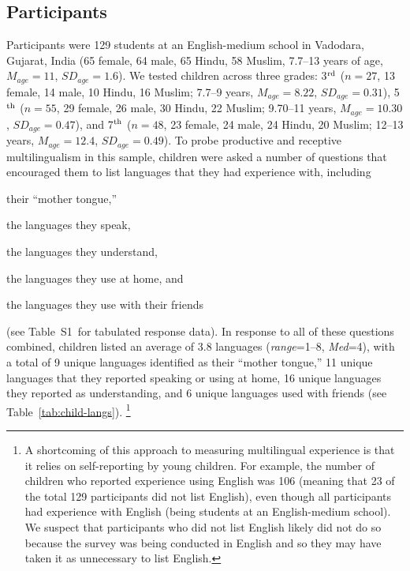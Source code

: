 \documentclass{foushee-adapted-preprint}
\newcommand{\fulllanguagestab}{S1}
\begin{document}
\subsection{Participants}
Participants were 129 students at an English-medium school in Vadodara, Gujarat, India (65 female, 64 male, 65 Hindu, 58 Muslim, 7.7--13 years of age, $M_{age}=11$, $SD_{age}=1.6$). 
We tested children across three grades: 3$^{\textnormal{rd}}$ ($n=27$, 13 female, 14 male, 10 Hindu, 16 Muslim; 7.7--9 years, $M_{age}=8.22$, $SD_{age}=0.31$), 5$^{\textnormal{th}}$ ($n=55$, 29 female, 26 male, 30 Hindu, 22 Muslim; 9.70--11 years, $M_{age}=10.30$, $SD_{age}=0.47$), and 7$^{\textnormal{th}}$ ($n=48$, 23 female, 24 male, 24 Hindu, 20 Muslim; 12--13 years, $M_{age}=12.4$, $SD_{age}=0.49$). 
To probe productive and receptive multilingualism in this sample, children were asked a number of questions that encouraged them to list languages that they had experience with, including
\begin{inparaenum}[(1)]
    \item their ``mother tongue,''
    \item the languages they speak,
    \item the languages they understand,
    \item the languages they use at home, and
    \item the languages they use with their friends
\end{inparaenum} (see Table~\fulllanguagestab\ for tabulated response data). %
In response to all of these questions combined, children listed an average of 3.8 languages (\textit{range}=1--8, \textit{Med}=4), with a total of 9 unique languages identified as their ``mother tongue,'' 11 unique languages that they reported speaking or using at home, 16 unique languages they reported as understanding, and 6 unique languages used with friends (see Table~\ref{tab:child-langs}).%
\footnote{A shortcoming of this approach to measuring multilingual experience is that it relies on self-reporting by young children. For example, the number of children who reported experience using English was 106 (meaning that 23 of the total 129 participants did not list English), even though all participants had experience with English (being students at an English-medium school). 
We suspect that participants who did not list English likely did not do so because the survey was being conducted in English and so they may have taken it as unnecessary to list English.} 
\end{document}
